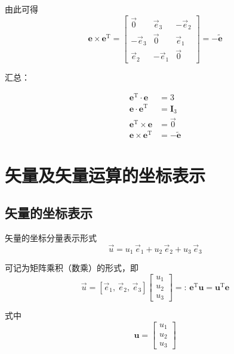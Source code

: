 由此可得
\begin{equation}
\boldsymbol{e} \times \boldsymbol{e}^{\mathrm{T}} = \begin{bmatrix} \vec{0} & \vec{e}_3 & -\vec{e}_2 \\ -\vec{e}_3 & \vec{0} & \vec{e}_1 \\ \vec{e}_2 & -\vec{e}_1 & \vec{0} \end{bmatrix} = -\tilde{\boldsymbol{e}}
\end{equation}

汇总：
\begin{myformula}
\begin{align}
\boldsymbol{e}^{\mathrm{T}} \cdot \boldsymbol{e} &= 3 \tag{I} \\
\boldsymbol{e} \cdot \boldsymbol{e}^{\mathrm{T}} &= \boldsymbol{I}_3 \tag{II} \\
\boldsymbol{e}^{\mathrm{T}} \times \boldsymbol{e} &= \vec{0} \tag{III} \\
\boldsymbol{e} \times \boldsymbol{e}^{\mathrm{T}} &= -\tilde{\boldsymbol{e}} \tag{IV}
\end{align}
\end{myformula}


\section{矢量及矢量运算的坐标表示}

\subsection{矢量的坐标表示}

矢量的坐标分量表示形式
\begin{equation}
\vec{u} = u_1\, \vec{e}_1 + u_2\, \vec{e}_2 + u_3\, \vec{e}_3
\end{equation}

可记为矩阵乘积（数乘）的形式，即
\begin{equation}\label{eq:4.vector_rep}
\vec{u} = [\vec{e}_1,\, \vec{e}_2,\, \vec{e}_3] \begin{bmatrix} u_1 \\ u_2 \\ u_3 \end{bmatrix} =:\, \boldsymbol{e}^{\mathrm{T}} \boldsymbol{u} = \boldsymbol{u}^{\mathrm{T}} \boldsymbol{e}
\end{equation}

式中
\begin{equation}
\boldsymbol{u} = \begin{bmatrix} u_1 \\ u_2 \\ u_3 \end{bmatrix}
\end{equation}


